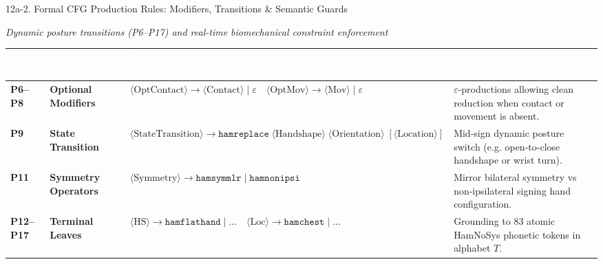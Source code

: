 \documentclass[aspectratio=169]{beamer}
\begin{document}
\begin{frame}[t]{12a-2. Formal CFG Production Rules: Modifiers, Transitions \& Semantic Guards}
\vspace{-0.1cm}
\begin{center}
    \scriptsize\textit{\textcolor{amritaMaroon}{Dynamic posture transitions (P6--P17) and real-time biomechanical constraint enforcement}}
\end{center}

\vspace{-1.5mm}
\centering
\setlength{\tabcolsep}{4pt}
\renewcommand{\arraystretch}{1.22}
{\fontsize{6.8pt}{8.6pt}\selectfont
\begin{tabular}{|>{\centering\arraybackslash\bfseries}p{1.1cm}|>{\raggedright\arraybackslash\bfseries}p{2.5cm}|>{\raggedright\arraybackslash}p{5.8cm}|>{\raggedright\arraybackslash}p{3.2cm}|}
    \hline
    \rowcolor{maroon}
    \textcolor{white}{\textbf{Rule ID}} & 
    \textcolor{white}{\textbf{Constituent}} & 
    \textcolor{white}{\textbf{Production Rule in BNF Form}} & 
    \textcolor{white}{\textbf{Linguistic Meaning}} \\
    \hline
    \rowcolor{lightpink} 
    \textbf{P6--P8} & Optional Modifiers & 
    $\langle\text{OptContact}\rangle \to \langle\text{Contact}\rangle \mid \varepsilon \quad \langle\text{OptMov}\rangle \to \langle\text{Mov}\rangle \mid \varepsilon$ & 
    $\varepsilon$-productions allowing clean reduction when contact or movement is absent. \\
    \hline
    \rowcolor{lightpurple} 
    \textbf{P9} & State Transition & 
    $\langle\text{StateTransition}\rangle \to \texttt{hamreplace} \;\langle\text{Handshape}\rangle \;\langle\text{Orientation}\rangle \;[\langle\text{Location}\rangle]$ & 
    Mid-sign dynamic posture switch (e.g. open-to-close handshape or wrist turn). \\
    \hline
    \rowcolor{lightblue} 
    \textbf{P11} & Symmetry Operators & 
    $\langle\text{Symmetry}\rangle \to \texttt{hamsymmlr} \mid \texttt{hamnonipsi}$ & 
    Mirror bilateral symmetry vs non-ipsilateral signing hand configuration. \\
    \hline
    \rowcolor{white} 
    \textbf{P12--P17} & Terminal Leaves & 
    $\langle\text{HS}\rangle \to \texttt{hamflathand} \mid \dots \quad \langle\text{Loc}\rangle \to \texttt{hamchest} \mid \dots$ & 
    Grounding to 83 atomic HamNoSys phonetic tokens in alphabet $T$. \\
    \hline
\end{tabular}
}


\end{frame}
\end{document}
